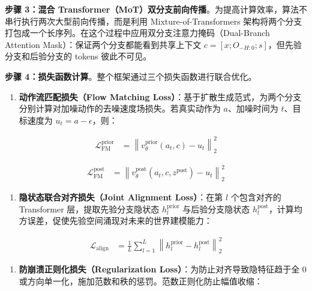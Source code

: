 \textbf{步骤 3：混合 Transformer（MoT）双分支前向传播}。为提高计算效率，算法不串行执行两次大型前向传播，而是利用 Mixture-of-Transformers 架构将两个分支打包成一个长序列。在这个过程中应用双分支注意力掩码（Dual-Branch Attention Mask）：保证两个分支都能看到共享上下文 \(c=[x;O_{-H:0};s]\)，但先验分支和后验分支的 tokens 彼此不可见。

\textbf{步骤 4：损失函数计算}。整个框架通过三个损失函数进行联合优化。

\begin{enumerate}
\def\labelenumi{\arabic{enumi}.}
\tightlist
\item
  \textbf{动作流匹配损失（Flow Matching Loss）}：基于扩散生成范式，为两个分支分别计算对加噪动作的去噪速度场损失。若真实动作为 \(a\)、加噪时间为 \(t\)、目标速度为 \(u_t=a-\epsilon\)，则：
\end{enumerate}

\[
\begin{aligned}
\mathcal{L}_{\mathrm{FM}}^{\mathrm{prior}}
&=
\left\|
v_\theta^{\mathrm{prior}}(a_t,c) - u_t
\right\|_2^2
\end{aligned}
\]

\[
\begin{aligned}
\mathcal{L}_{\mathrm{FM}}^{\mathrm{post}}
&=
\left\|
v_\theta^{\mathrm{post}}(a_t,c,z^{\mathrm{post}}) - u_t
\right\|_2^2
\end{aligned}
\]

\begin{enumerate}
\def\labelenumi{\arabic{enumi}.}
\setcounter{enumi}{1}
\tightlist
\item
  \textbf{隐状态联合对齐损失（Joint Alignment Loss）}：在第 \(l\) 个包含对齐的 Transformer 层，提取先验分支隐状态 \(h_l^{\mathrm{prior}}\) 与后验分支隐状态 \(h_l^{\mathrm{post}}\)，计算均方误差，促使先验空间涌现对未来的世界建模能力：
\end{enumerate}

\[
\begin{aligned}
\mathcal{L}_{\mathrm{align}}
&=
\frac{1}{L}
\sum_{l=1}^{L}
\left\|
h_l^{\mathrm{prior}} - h_l^{\mathrm{post}}
\right\|_2^2
\end{aligned}
\]

\begin{enumerate}
\def\labelenumi{\arabic{enumi}.}
\setcounter{enumi}{2}
\tightlist
\item
  \textbf{防崩溃正则化损失（Regularization Loss）}：为防止对齐导致隐特征趋于全 0 或方向单一化，施加范数和秩的惩罚。范数正则化防止幅值收缩：
\end{enumerate}


